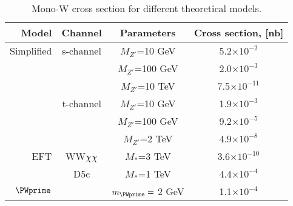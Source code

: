 \begin{table}[]
  \begin{tabular}{r|c|c|c}
    Model 	& Channel 	  & Parameters	    & Cross section, [nb] \\
    \midrule
    Simplified  & s-channel	  & $M_{Z'}$=10 GeV    & 5.2$\times 10^{-2}$ \\
		&		  & $M_{Z'}$=100 GeV  & 2.0$\times 10^{-3}$ \\
		&		  & $M_{Z'}$=10 TeV   & 7.5$\times 10^{-11}$ \\ 
		& t-channel	  & $M_{Z'}$=10 GeV   & 1.9$\times 10^{-3}$ \\
		&		  & $M_{Z'}$=100 GeV  & 9.2$\times 10^{-5}$ \\
		&		  & $M_{Z'}$=2 TeV    & 4.9$\times 10^{-8}$ \\
    \midrule
EFT 	& WW$\chi\chi$	  & $M_{*}$=3 TeV    & 3.6$\times 10^{-10}$ \\
	& D5c		  & $M_{*}$=1 TeV	& 4.4$\times 10^{-4}$ \\
    \midrule	
$\PWprime$ 	& 	  & $m_{\PWprime} =$ 2 GeV   & 1.1$\times 10^{-4}$ \\    
  \end{tabular}
  \caption{Mono-W cross section for different theoretical models.}
  \label{tab:sample_params_xsec}
\end{table}











